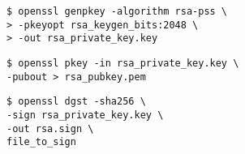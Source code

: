\documentclass[a4paper,twoside]{article}
\begin{document}
\begin{minipage}{\linewidth}
  \center
  \begin{verbatim}
$ openssl genpkey -algorithm rsa-pss \
> -pkeyopt rsa_keygen_bits:2048 \
> -out rsa_private_key.key
  \end{verbatim}
\end{minipage}

\begin{minipage}{\linewidth}
  \center
  \begin{verbatim}
$ openssl pkey -in rsa_private_key.key \
-pubout > rsa_pubkey.pem
  \end{verbatim}
\end{minipage}

\begin{minipage}{\linewidth}
  \center
  \begin{verbatim}
$ openssl dgst -sha256 \
-sign rsa_private_key.key \
-out rsa.sign \
file_to_sign
  \end{verbatim}
\end{minipage}
\end{document}
